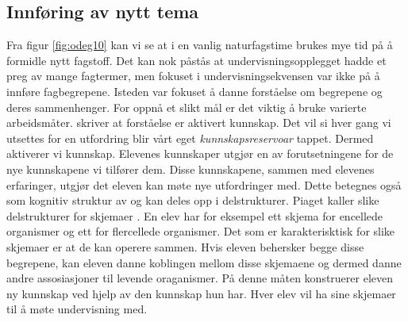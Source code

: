 \documentclass[main.tex]{subfiles}
\begin{document}
\subsection*{Innføring av nytt tema}
Fra figur \ref{fig:odeg10} kan vi se at i en vanlig naturfagstime brukes mye tid på å formidle 
nytt fagstoff. Det kan nok påstås at undervisningsopplegget hadde et preg av mange fagtermer, men 
fokuset i undervisningsekvensen var ikke på å innføre fagbegrepene. Isteden var fokuset å danne 
forståelse om begrepene og deres sammenhenger. For oppnå et slikt mål er det viktig å bruke varierte 
arbeidsmåter. %
\newline
\newline
{} skriver at forståelse er aktivert kunnskap. Det vil si hver gang vi utsettes 
for en utfordring blir vårt eget \emph{kunnskapsreservoar} tappet. Dermed aktiverer vi kunnskap. 
Elevenes kunnskaper utgjør en av forutsetningene for de nye kunnskapene vi tilfører dem. Disse 
kunnskapene, sammen med elevenes erfaringer, utgjør det eleven kan møte nye utfordringer med. Dette 
betegnes også som kognitiv struktur av  og kan deles opp i delstrukturer. Piaget 
kaller slike delstrukturer for skjemaer . En elev har for eksempel ett skjema 
for encellede organismer og ett for flercellede organismer. Det som er karakterisktisk for slike 
skjemaer er at de kan operere sammen. Hvis eleven behersker begge disse begrepene, kan eleven danne 
koblingen mellom disse skjemaene og dermed danne andre assosiasjoner til levende oraganismer. 
På denne måten konstruerer eleven ny kunnskap ved hjelp av den kunnskap hun har. Hver elev vil 
ha sine skjemaer til å møte undervisning med.

\end{document}
